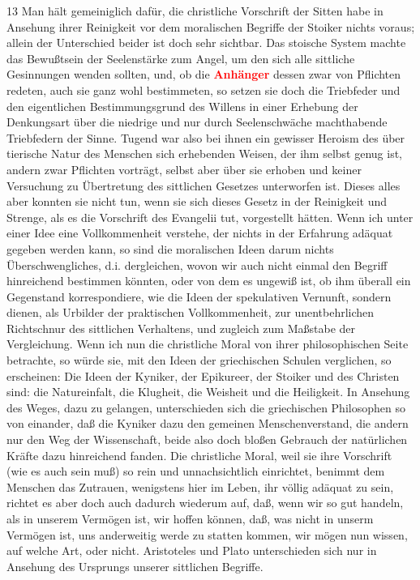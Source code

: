\documentclass[a4paper,12pt,twoside]{book}
\newcommand{\match}[1]{\textcolor{red}{\textbf{#1}}}
\begin{document}
	13 Man hält gemeiniglich dafür, die christliche Vorschrift der Sitten habe in Ansehung ihrer Reinigkeit vor dem moralischen Begriffe der Stoiker nichts voraus; allein der Unterschied beider ist doch sehr sichtbar. Das stoische System machte das Bewußtsein der Seelenstärke zum Angel, um den sich alle sittliche Gesinnungen wenden sollten, und, ob die \match{Anhänger} dessen zwar von Pflichten redeten, auch sie ganz wohl bestimmeten, so setzen sie doch die Triebfeder und den eigentlichen Bestimmungsgrund des Willens in einer Erhebung der Denkungsart über die niedrige und nur durch Seelenschwäche machthabende Triebfedern der Sinne. Tugend war also bei ihnen ein gewisser Heroism des über tierische Natur des Menschen sich erhebenden Weisen, der ihm selbst genug ist, andern zwar Pflichten vorträgt, selbst aber über sie erhoben und keiner Versuchung zu Übertretung des sittlichen Gesetzes unterworfen ist. Dieses alles aber konnten sie nicht tun, wenn sie sich dieses Gesetz in der Reinigkeit und Strenge, als es die Vorschrift des Evangelii tut, vorgestellt hätten. Wenn ich unter einer Idee eine Vollkommenheit verstehe, der nichts in der Erfahrung adäquat gegeben werden kann, so sind die moralischen Ideen darum nichts Überschwengliches, d.i. dergleichen, wovon wir auch nicht einmal den Begriff hinreichend bestimmen könnten, oder von dem es ungewiß ist, ob ihm überall ein Gegenstand korrespondiere, wie die Ideen der spekulativen Vernunft, sondern dienen, als Urbilder der praktischen Vollkommenheit, zur unentbehrlichen Richtschnur des sittlichen Verhaltens, und zugleich zum Maßstabe der Vergleichung. Wenn ich nun die christliche Moral von ihrer philosophischen Seite betrachte, so würde sie, mit den Ideen der griechischen Schulen verglichen, so erscheinen: Die Ideen der Kyniker, der Epikureer, der Stoiker und des Christen sind: die Natureinfalt, die Klugheit, die Weisheit und die Heiligkeit. In Ansehung des Weges, dazu zu gelangen, unterschieden sich die griechischen Philosophen so von einander, daß die Kyniker dazu den gemeinen Menschenverstand, die andern nur den Weg der Wissenschaft, beide also doch bloßen Gebrauch der natürlichen Kräfte dazu hinreichend fanden. Die christliche Moral, weil sie ihre Vorschrift (wie es auch sein muß) so rein und unnachsichtlich einrichtet, benimmt dem Menschen das Zutrauen, wenigstens hier im Leben, ihr völlig adäquat zu sein, richtet es aber doch auch dadurch wiederum auf, daß, wenn wir so gut handeln, als in unserem Vermögen ist, wir hoffen können, daß, was nicht in unserm Vermögen ist, uns anderweitig werde zu statten kommen, wir mögen nun wissen, auf welche Art, oder nicht. Aristoteles und Plato unterschieden sich nur in Ansehung des Ursprungs unserer sittlichen Begriffe. 
	
\end{document}
